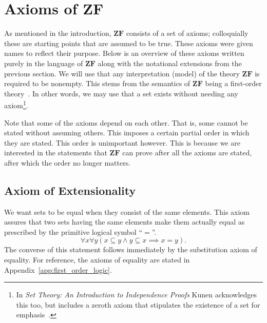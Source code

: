\documentclass[../main.tex]{subfiles}
\begin{document}
\section{Axioms of \texorpdfstring{$\mathbf{ZF}$}{ZF}}\label{sec:zermelo_fraenkel_set_theory:axioms_of_zf}
As mentioned in the introduction, $\mathbf{ZF}$ consists of a set of axioms; colloquially these are starting points that are assumed to be true. These axioms were given names to reflect their purpose. Below is an overview of these axioms written purely in the language of $\mathbf{ZF}$ along with the notational extensions from the previous section. We will use that any interpretation (model) of the theory $\mathbf{ZF}$ is required to be nonempty. This stems from the semantics of $\mathbf{ZF}$ being a first-order theory~\cite{Enderton2001}. In other words, we may use that a set exists without needing any axiom\footnote{In \textit{Set Theory: An Introduction to Independence Proofs} Kunen acknowledges this too, but includes a zeroth axiom that stipulates the existence of a set for emphasis~\cite{Kunen1992}.}.

Note that some of the axioms depend on each other. That is, some cannot be stated without assuming others. This imposes a certain partial order in which they are stated. This order is unimportant however. This is because we are interested in the statements that $\mathbf{ZF}$ can prove after all the axioms are stated, after which the order no longer matters.

\subsection*{Axiom of Extensionality}\label{subsec:zermelo_fraenkel_set_theory:axiom_of_extensionality}
We want sets to be equal when they consist of the same elements. This axiom assures that two sets having the same elements make them actually equal as prescribed by the primitive logical symbol ``$=$''.
\begin{equation*}
    \forall x\forall y(x\subseteq y\land y\subseteq x\implies x=y).
\end{equation*}
The converse of this statement follows immediately by the substitution axiom of equality. For reference, the axioms of equality are stated in Appendix~\ref{app:first_order_logic}.
\end{document}

